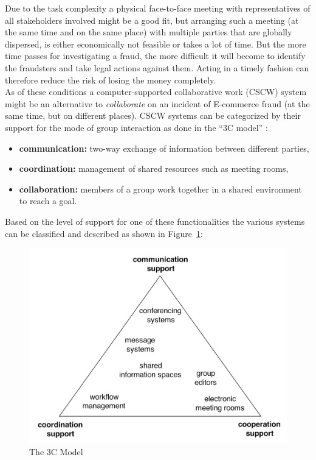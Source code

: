 Due to the task complexity a physical face-to-face meeting with representatives of all stakeholders involved might be a good fit, but arranging such a meeting (at the same time and on the same place) with multiple parties that are globally dispersed, is either economically not feasible or takes a lot of time. But the more time passes for investigating a fraud, the more difficult it will become to identify the fraudsters and take legal actions against them. Acting in a timely fashion can therefore reduce the risk of losing the money completely. \\

As of these conditions a computer-supported collaborative work (\gls{CSCW}) system might be an alternative to \emph{collaborate} on an incident of \gls{E-commerce} fraud (at the same time, but on different places). \gls{CSCW} systems can be categorized by their support for the mode of group interaction as done in the ``3C model'' \citep{Koch2008}: \@

\begin{itemize}
    \item\textbf{communication:} two-way exchange of information between different parties,
    \item\textbf{coordination:} management of shared resources such as meeting rooms,
    \item\textbf{collaboration:} members of a group work together in a shared environment to reach a goal.
\end{itemize}

Based on the level of support for one of these functionalities the various systems can be classified and described as shown in Figure~\ref{fig:images_3C_model}: \@

\begin{figure}[H]
	\centering
		\includegraphics[width=0.9\columnwidth]{images/3C-model.png}
	\caption[The 3C Model]{The 3C Model \citep{Koch2008}}
\label{fig:images_3C_model}
\end{figure}

